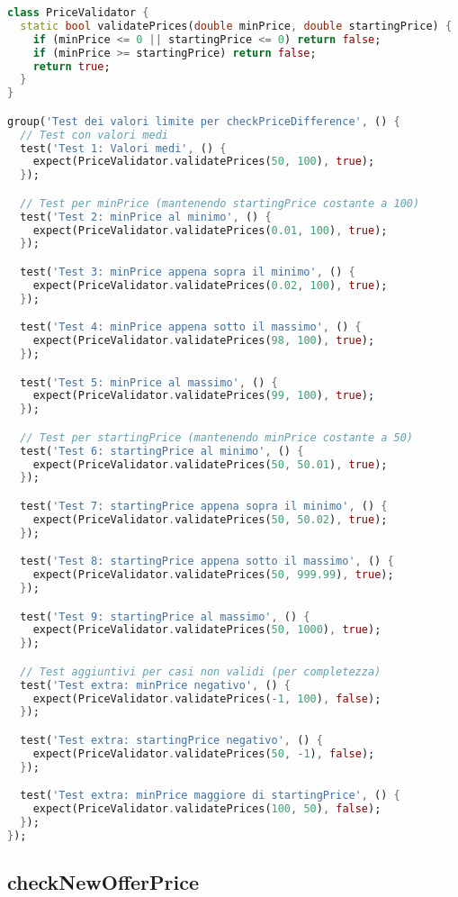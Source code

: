 \begin{lstlisting}[language=Dart]
class PriceValidator {
  static bool validatePrices(double minPrice, double startingPrice) {
    if (minPrice <= 0 || startingPrice <= 0) return false;
    if (minPrice >= startingPrice) return false;
    return true;
  }
}

group('Test dei valori limite per checkPriceDifference', () {
  // Test con valori medi
  test('Test 1: Valori medi', () {
    expect(PriceValidator.validatePrices(50, 100), true);
  });

  // Test per minPrice (mantenendo startingPrice costante a 100)
  test('Test 2: minPrice al minimo', () {
    expect(PriceValidator.validatePrices(0.01, 100), true);
  });

  test('Test 3: minPrice appena sopra il minimo', () {
    expect(PriceValidator.validatePrices(0.02, 100), true);
  });

  test('Test 4: minPrice appena sotto il massimo', () {
    expect(PriceValidator.validatePrices(98, 100), true);
  });

  test('Test 5: minPrice al massimo', () {
    expect(PriceValidator.validatePrices(99, 100), true);
  });

  // Test per startingPrice (mantenendo minPrice costante a 50)
  test('Test 6: startingPrice al minimo', () {
    expect(PriceValidator.validatePrices(50, 50.01), true);
  });

  test('Test 7: startingPrice appena sopra il minimo', () {
    expect(PriceValidator.validatePrices(50, 50.02), true);
  });

  test('Test 8: startingPrice appena sotto il massimo', () {
    expect(PriceValidator.validatePrices(50, 999.99), true);
  });

  test('Test 9: startingPrice al massimo', () {
    expect(PriceValidator.validatePrices(50, 1000), true);
  });

  // Test aggiuntivi per casi non validi (per completezza)
  test('Test extra: minPrice negativo', () {
    expect(PriceValidator.validatePrices(-1, 100), false);
  });

  test('Test extra: startingPrice negativo', () {
    expect(PriceValidator.validatePrices(50, -1), false);
  });

  test('Test extra: minPrice maggiore di startingPrice', () {
    expect(PriceValidator.validatePrices(100, 50), false);
  });
});
    \end{lstlisting}
\newpage
\subsection{checkNewOfferPrice}

